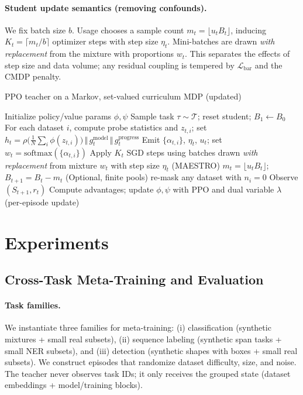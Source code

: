 \documentclass[11pt]{article}
\newcommand{\1}{\mathbf{1}}
\newcommand{\MAESTRO}{\textsc{MAESTRO}\xspace}
\begin{document}
\paragraph{Student update semantics (removing confounds).}
We fix batch size $b$.
Usage chooses a sample count $m_t=\lfloor u_t B_t\rfloor$, inducing $K_t=\lceil m_t/b\rceil$ optimizer steps with step size $\eta_t$.
Mini-batches are drawn \emph{with replacement} from the mixture with proportions $w_t$.
This separates the effects of step size and data volume; any residual coupling is tempered by $\mathcal{L}_{\text{bar}}$ and the CMDP penalty.

\begin{algorithm}[H]
\caption{PPO teacher on a Markov, set-valued curriculum MDP (updated)}
\label{alg:ppo}
\begin{algorithmic}[1]
\State Initialize policy/value params $\phi,\psi$
    \State Sample task $\tau\sim\mathcal{T}$; reset student; $B_1\leftarrow B_0$
      \State {}
      \State For each dataset $i$, compute probe statistics and $z_{t,i}$; set $h_t=\rho\!\big(\tfrac{1}{N}\sum_i \phi(z_{t,i})\big)\,\Vert\,g^{\text{model}}_t\,\Vert\,g^{\text{progress}}_t$
      \State Emit $\{\alpha_{t,i}\}$, $\eta_t$, $u_t$; set $w_t=\mathrm{softmax}(\{\alpha_{t,i}\})$
      \State Apply $K_t$ SGD steps using batches drawn \emph{with replacement} from mixture $w_t$ with step size $\eta_t$ (\MAESTRO{})
      \State $m_t=\lfloor u_t B_t\rfloor$;\quad $B_{t+1}=B_t-m_t$
      \State (Optional, finite pools) re-mask any dataset with $n_i=0$
      \State Observe $(S_{t+1}, r_t)$
    \EndFor
  \EndFor
  \State Compute advantages; update $\phi,\psi$ with PPO and dual variable $\lambda$ (per-episode update)
\EndFor
\end{algorithmic}
\end{algorithm}

\section{Experiments}
\subsection{Cross-Task Meta-Training and Evaluation}
\paragraph{Task families.}
We instantiate three families for meta-training: (i) classification (synthetic mixtures + small real subsets), (ii) sequence labeling (synthetic span tasks + small NER subsets), and (iii) detection (synthetic shapes with boxes + small real subsets). 
We construct episodes that randomize dataset difficulty, size, and noise. 
The teacher never observes task IDs; it only receives the grouped state (dataset embeddings + model/training blocks).
\end{document}
